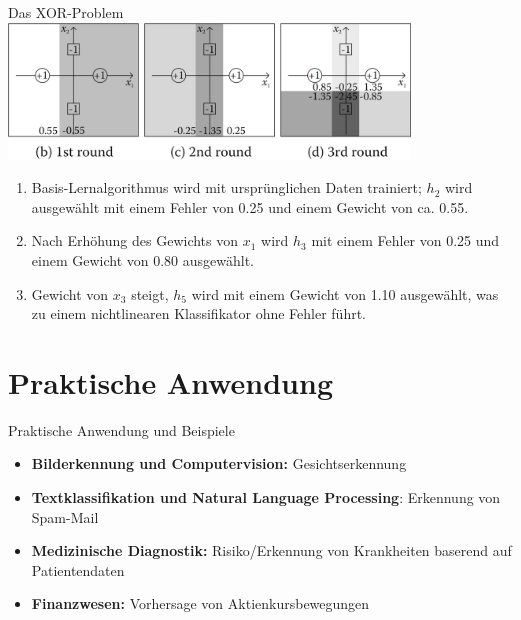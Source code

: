 \documentclass[hyperref={bookmarks=false},11pt,dvipsnames]{beamer}
\begin{document}
\begin{frame}{Das XOR-Problem}
	\centering
	\includegraphics[width=0.8\textwidth]{../Ausarbeitung/figures/XOR_Solution.png}
	\begin{enumerate}
		\item <1-> Basis-Lernalgorithmus wird mit ursprünglichen Daten trainiert; $h_2$
		      wird ausgewählt mit einem Fehler von 0.25 und einem Gewicht von ca. 0.55.
		\item <2-> Nach Erhöhung des Gewichts von $x_1$ wird $h_3$
		      mit einem Fehler von 0.25 und einem Gewicht von 0.80 ausgewählt.
		\item <3-> Gewicht von $x_3$ steigt, $h_5$ wird mit einem Gewicht von
		      1.10 ausgewählt, was zu einem nichtlinearen Klassifikator ohne Fehler führt.
	\end{enumerate}
\end{frame}

\section{Praktische Anwendung}
\begin{frame}{Praktische Anwendung und Beispiele}
	\begin{itemize}
		\item \textbf{Bilderkennung und Computervision:} Gesichtserkennung~\cite{viola2001rapid}
		\item \textbf{Textklassifikation und Natural Language Processing}: Erkennung von Spam-Mail~\cite{panwar2022detection}
		\item \textbf{Medizinische Diagnostik:} Risiko/Erkennung von Krankheiten baserend auf Patientendaten~\cite{hatwell2020ada}
		\item \textbf{Finanzwesen:} Vorhersage von Aktienkursbewegungen~\cite{zhang2016stock}
	\end{itemize}
\end{frame}
\end{document}
